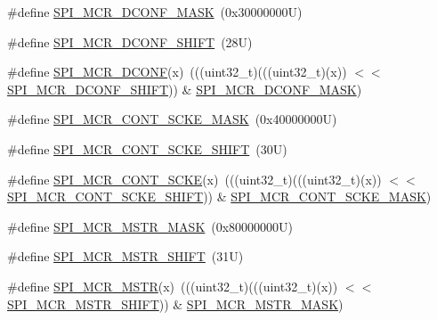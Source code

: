 \begin{DoxyCompactItemize}
\item 
\#define \mbox{\hyperlink{group___c_a_n___register___masks_gab6f80a07ce3be21ee0de56c3de90f380}{S\+P\+I\+\_\+\+M\+C\+R\+\_\+\+D\+C\+O\+N\+F\+\_\+\+M\+A\+SK}}~(0x30000000\+U)
\item 
\#define \mbox{\hyperlink{group___c_a_n___register___masks_ga5f84d391d6b5838c50b44217617d66a8}{S\+P\+I\+\_\+\+M\+C\+R\+\_\+\+D\+C\+O\+N\+F\+\_\+\+S\+H\+I\+FT}}~(28\+U)
\item 
\#define \mbox{\hyperlink{group___c_a_n___register___masks_ga4157226a8f489e3d1d8321beed0afcb6}{S\+P\+I\+\_\+\+M\+C\+R\+\_\+\+D\+C\+O\+NF}}(x)~(((uint32\+\_\+t)(((uint32\+\_\+t)(x)) $<$$<$ \mbox{\hyperlink{group___c_a_n___register___masks_ga5f84d391d6b5838c50b44217617d66a8}{S\+P\+I\+\_\+\+M\+C\+R\+\_\+\+D\+C\+O\+N\+F\+\_\+\+S\+H\+I\+FT}})) \& \mbox{\hyperlink{group___c_a_n___register___masks_gab6f80a07ce3be21ee0de56c3de90f380}{S\+P\+I\+\_\+\+M\+C\+R\+\_\+\+D\+C\+O\+N\+F\+\_\+\+M\+A\+SK}})
\item 
\#define \mbox{\hyperlink{group___c_a_n___register___masks_gad40a2cace787fe5eaaf74379ffb7cfc2}{S\+P\+I\+\_\+\+M\+C\+R\+\_\+\+C\+O\+N\+T\+\_\+\+S\+C\+K\+E\+\_\+\+M\+A\+SK}}~(0x40000000\+U)
\item 
\#define \mbox{\hyperlink{group___c_a_n___register___masks_ga57c862186e43a26823716267bfadd92f}{S\+P\+I\+\_\+\+M\+C\+R\+\_\+\+C\+O\+N\+T\+\_\+\+S\+C\+K\+E\+\_\+\+S\+H\+I\+FT}}~(30\+U)
\item 
\#define \mbox{\hyperlink{group___c_a_n___register___masks_ga741c4834ced3eb76c50fd2e161791689}{S\+P\+I\+\_\+\+M\+C\+R\+\_\+\+C\+O\+N\+T\+\_\+\+S\+C\+KE}}(x)~(((uint32\+\_\+t)(((uint32\+\_\+t)(x)) $<$$<$ \mbox{\hyperlink{group___c_a_n___register___masks_ga57c862186e43a26823716267bfadd92f}{S\+P\+I\+\_\+\+M\+C\+R\+\_\+\+C\+O\+N\+T\+\_\+\+S\+C\+K\+E\+\_\+\+S\+H\+I\+FT}})) \& \mbox{\hyperlink{group___c_a_n___register___masks_gad40a2cace787fe5eaaf74379ffb7cfc2}{S\+P\+I\+\_\+\+M\+C\+R\+\_\+\+C\+O\+N\+T\+\_\+\+S\+C\+K\+E\+\_\+\+M\+A\+SK}})
\item 
\#define \mbox{\hyperlink{group___c_a_n___register___masks_gaa201344af736c83618497329b6529f04}{S\+P\+I\+\_\+\+M\+C\+R\+\_\+\+M\+S\+T\+R\+\_\+\+M\+A\+SK}}~(0x80000000\+U)
\item 
\#define \mbox{\hyperlink{group___c_a_n___register___masks_ga7118ec0360c840ddef7e666831cb13fb}{S\+P\+I\+\_\+\+M\+C\+R\+\_\+\+M\+S\+T\+R\+\_\+\+S\+H\+I\+FT}}~(31\+U)
\item 
\#define \mbox{\hyperlink{group___c_a_n___register___masks_ga8c511b3daf106ff16f3b1ecec55ef2d2}{S\+P\+I\+\_\+\+M\+C\+R\+\_\+\+M\+S\+TR}}(x)~(((uint32\+\_\+t)(((uint32\+\_\+t)(x)) $<$$<$ \mbox{\hyperlink{group___c_a_n___register___masks_ga7118ec0360c840ddef7e666831cb13fb}{S\+P\+I\+\_\+\+M\+C\+R\+\_\+\+M\+S\+T\+R\+\_\+\+S\+H\+I\+FT}})) \& \mbox{\hyperlink{group___c_a_n___register___masks_gaa201344af736c83618497329b6529f04}{S\+P\+I\+\_\+\+M\+C\+R\+\_\+\+M\+S\+T\+R\+\_\+\+M\+A\+SK}})
\end{DoxyCompactItemize}
